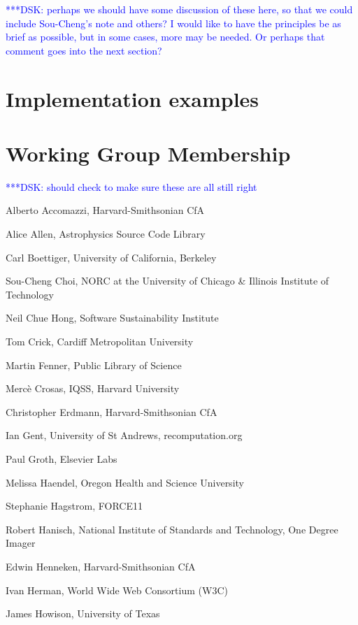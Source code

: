 \documentclass[11pt, oneside]{amsart}
\newcommand{\katznote}[1]{ {\textcolor{blue} { ***DSK: #1 }}}
\begin{document}
\katznote{perhaps we should have some discussion of these here, so that we could include Sou-Cheng's note and others?  I would like to have the principles be as brief as possible, but in some cases, more may be needed.  Or perhaps that comment goes into the next section?}


\section{Implementation examples}
\label{sec:examples}

\appendix

\section{Working Group Membership}
\label{app:wg_members}

\katznote{should check to make sure these are all still right}

Alberto Accomazzi, Harvard-Smithsonian CfA

Alice Allen, Astrophysics Source Code Library

Carl Boettiger, University of California,  Berkeley

Sou-Cheng Choi, NORC at the University of Chicago \& Illinois Institute of Technology	

Neil Chue Hong, Software Sustainability Institute	

Tom Crick, Cardiff Metropolitan University	

Martin Fenner, Public Library of Science	

Merc\`e Crosas, IQSS, Harvard University	

Christopher Erdmann, Harvard-Smithsonian CfA	

Ian Gent, University of St Andrews, recomputation.org	

Paul Groth, Elsevier Labs	

Melissa Haendel, Oregon Health and Science University

Stephanie Hagstrom, FORCE11	

Robert Hanisch, National Institute of Standards and Technology, One Degree Imager	

Edwin Henneken, Harvard-Smithsonian CfA	

Ivan Herman, World Wide Web Consortium (W3C)

James Howison, University of Texas	
\end{document}
